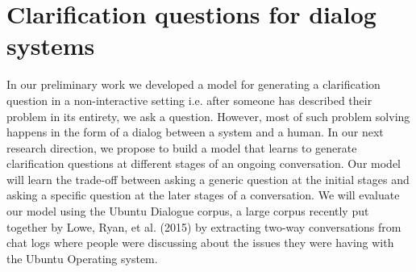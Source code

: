 \documentclass[11pt]{report}
\numberwithin{equation}{section}
\begin{document}
\section{Clarification questions for dialog systems}

In our preliminary work we developed a model for generating a clarification question in a non-interactive setting i.e. after someone has described their problem in its entirety, we ask a question. However, most of such problem solving happens in the form of a dialog between a system and a human. In our next research direction, we propose to build a model that learns to generate  clarification questions at different stages of an ongoing conversation. Our model will learn the trade-off between asking a generic question at the initial stages and asking a specific question at the later stages of a conversation. We will evaluate our model using the Ubuntu Dialogue corpus, a large corpus recently put together by Lowe, Ryan, et al. (2015) by extracting two-way conversations from chat logs where people were discussing about the issues they were having with the Ubuntu Operating system.

\newpage

\begin{small}


\end{small}
\end{document}
